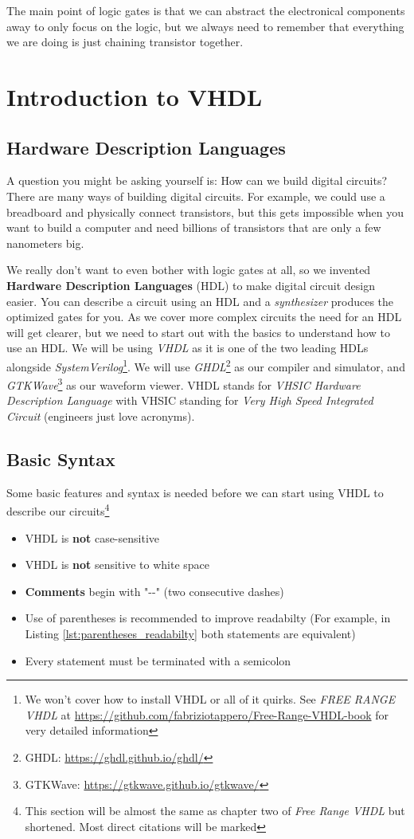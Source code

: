 \documentclass[a4paper,10pt]{IEEEtran}
\begin{document}
The main point of logic gates is that we can abstract the electronical components away to only focus on the logic, but we always need to remember that everything we are doing is just chaining transistor together.

\section{Introduction to VHDL}
\subsection{Hardware Description Languages}
A question you might be asking yourself is: How can we build digital circuits? There are many ways of building digital circuits. For example, we could use a breadboard and physically connect transistors, but this gets impossible when you want to build a computer and need billions of transistors that are only a few nanometers big. 

We really don't want to even bother with logic gates at all, so we invented \textbf{Hardware Description Languages} (HDL) to make digital circuit design easier. You can describe a circuit using an HDL and a \emph{synthesizer} produces the optimized gates for you. As we cover more complex circuits the need for an HDL will get clearer, but we need to start out with the basics to understand how to use an HDL. We will be using \emph{VHDL} as it is one of the two leading HDLs alongside \emph{SystemVerilog}\footnote{We won't cover how to install VHDL or all of it quirks. See \emph{FREE RANGE VHDL} at \url{https://github.com/fabriziotappero/Free-Range-VHDL-book} for very detailed information}. We will use \emph{GHDL}\footnote{GHDL: \url{https://ghdl.github.io/ghdl/}} as our compiler and simulator, and \emph{GTKWave}\footnote{GTKWave: \url{https://gtkwave.github.io/gtkwave/}} as our waveform viewer.
VHDL stands for \emph{VHSIC Hardware Description Language} with VHSIC standing for \emph{Very High Speed Integrated Circuit} (engineers just love acronyms).

\subsection{Basic Syntax}
Some basic features and syntax is needed before we can start using VHDL to describe our circuits\footnote{This section will be almost the same as chapter two of \emph{Free Range VHDL} \cite{free-range-vhdl} but shortened. Most direct citations will be marked} 
\begin{itemize}
    \item VHDL is \textbf{not} case-sensitive
    \item VHDL is \textbf{not} sensitive to white space
    \item \textbf{Comments} begin with "{-}{-}" (two consecutive dashes)
    \item Use of parentheses is recommended to improve readabilty (For example, in Listing \ref{lst:parentheses_readabilty} both statements are equivalent)
    \item Every statement must be terminated with a semicolon
\end{itemize}
\end{document}
